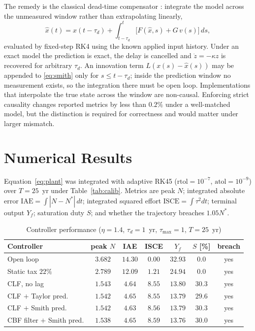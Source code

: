 \documentclass[conference,letterpaper,10pt]{IEEEtran}
\theoremstyle{plain}
\theoremstyle{remark}
\newcommand{\Nt}{N^{\ast}}
\begin{document}
The remedy is the classical dead-time compensator
\cite{smith1957,manitius1979,krstic2009}: integrate the model across
the unmeasured window rather than extrapolating linearly,
\begin{equation}
\label{eq:smith}
    \hat{x}(t) = x(t-\tau_d) + \int_{t-\tau_d}^{t}\!\big[F(\hat{x},s) + G\,v(s)\big]\,ds ,
\end{equation}
evaluated by fixed-step RK4 using the known applied input history.
Under an exact model the prediction is exact, the delay is cancelled
and $\dot z=-\kappa z$ is recovered for arbitrary $\tau_d$. An
innovation term $L(x(s)-\hat{x}(s))$ may be appended to
\eqref{eq:smith} only for $s\le t-\tau_d$; inside the prediction window
no measurement exists, so the integration there must be open loop.
Implementations that interpolate the true state across the window are
non-causal. Enforcing strict causality changes reported metrics by less
than $0.2\%$ under a well-matched model, but the distinction is
required for correctness and would matter under larger mismatch.

\section{Numerical Results}
\label{sec:results}
Equation~\eqref{eq:plant} was integrated with adaptive RK45
($\mathrm{rtol}=10^{-7}$, $\mathrm{atol}=10^{-9}$) over $T=25$~yr under
Table~\ref{tab:calib}. Metrics are peak $N$; integrated absolute error
$\mathrm{IAE}=\int|N-\Nt|\,dt$; integrated squared effort
$\mathrm{ISCE}=\int\tau^2dt$; terminal output $Y_f$; saturation duty
$S$; and whether the trajectory breaches $1.05\Nt$.

\begin{table}[!t]
\centering
\caption{Controller performance ($\eta=1.4$, $\tau_d=1$~yr, $\tau_{\max}=1$, $T=25$~yr)}
\label{tab:metrics}
\setlength{\tabcolsep}{3.5pt}
\begin{tabular}{lcccccc}
\toprule
Controller & peak $N$ & IAE & ISCE & $Y_f$ & $S$ [\%] & breach \\
\midrule
Open loop                  & $3.682$ & $14.30$ & $0.00$ & $32.93$ & $0.0$  & yes \\
Static tax $22\%$          & $2.789$ & $12.09$ & $1.21$ & $24.94$ & $0.0$  & yes \\
CLF, no lag                & $1.543$ & $4.64$  & $8.55$ & $13.80$ & $30.3$ & yes \\
CLF $+$ Taylor pred.       & $1.542$ & $4.65$  & $8.55$ & $13.79$ & $29.6$ & yes \\
CLF $+$ Smith pred.        & $1.542$ & $\bm{4.63}$ & $8.56$ & $13.79$ & $30.3$ & yes \\
CBF filter $+$ Smith pred. & $\bm{1.538}$ & $4.65$ & $8.59$ & $13.76$ & $30.0$ & yes \\
\bottomrule
\end{tabular}
\end{table}
\end{document}
